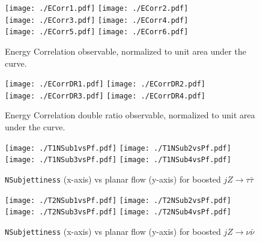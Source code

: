 \begin{figure}[H]
    \begin{center}
        \texttt{[image: ./ECorr1.pdf]}
        \texttt{[image: ./ECorr2.pdf]}\\
        \texttt{[image: ./ECorr3.pdf]}
        \texttt{[image: ./ECorr4.pdf]}\\
        \texttt{[image: ./ECorr5.pdf]}
        \texttt{[image: ./ECorr6.pdf]}\\
        \caption{ Energy Correlation observable, normalized to unit area under the curve. }
        \label{fig:ECorr}
    \end{center}
\end{figure}

\begin{figure}[H]
    \begin{center}
        \texttt{[image: ./ECorrDR1.pdf]}
        \texttt{[image: ./ECorrDR2.pdf]}\\
        \texttt{[image: ./ECorrDR3.pdf]}
        \texttt{[image: ./ECorrDR4.pdf]}\\
        \caption{ Energy Correlation double ratio observable, normalized to unit area under the curve. }
        \label{fig:ECorrDR}
    \end{center}
\end{figure}

\begin{figure}[H]
    \begin{center}
        \texttt{[image: ./T1NSub1vsPf.pdf]}
        \texttt{[image: ./T1NSub2vsPf.pdf]}\\
        \texttt{[image: ./T1NSub3vsPf.pdf]}
        \texttt{[image: ./T1NSub4vsPf.pdf]}\\
        \caption{ {\tt NSubjettiness} (x-axis) vs planar flow (y-axis) for boosted $jZ\rightarrow \tau \bar{\tau}$ }
        \label{fig:nsubvspf1}
    \end{center}
\end{figure}

\begin{figure}[H]
    \begin{center}
        \texttt{[image: ./T2NSub1vsPf.pdf]}
        \texttt{[image: ./T2NSub2vsPf.pdf]}\\
        \texttt{[image: ./T2NSub3vsPf.pdf]}
        \texttt{[image: ./T2NSub4vsPf.pdf]}\\
        \caption{ {\tt NSubjettiness} (x-axis) vs planar flow (y-axis) for boosted $jZ\rightarrow \nu \bar{\nu}$ }
        \label{fig:nsubvspf2}
    \end{center}
\end{figure}

